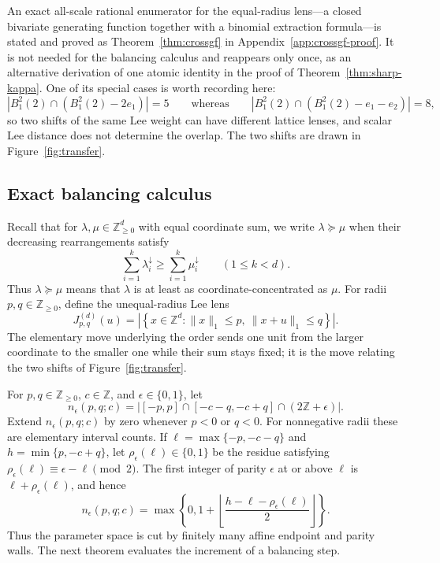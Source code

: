 \documentclass[pdflatex,sn-mathphys-num]{sn-jnl}
\theoremstyle{thmstyleone}
\theoremstyle{thmstylethree}
\theoremstyle{thmstyletwo}
\newcommand{\Z}{\mathbb Z}
\begin{document}
An exact all-scale rational enumerator for the equal-radius lens---a
closed bivariate generating function together with a binomial extraction
formula---is stated and proved as Theorem~\ref{thm:crossgf} in
Appendix~\ref{app:crossgf-proof}.  It is not needed for the balancing
calculus and reappears only once, as an alternative derivation of one
atomic identity in the proof of Theorem~\ref{thm:sharp-kappa}.  One of its
special cases is worth recording here:
\[
 |B_1^2(2)\cap(B_1^2(2)-2e_1)|=5
 \qquad\text{whereas}\qquad
 |B_1^2(2)\cap(B_1^2(2)-e_1-e_2)|=8,
\]
so two shifts of the same Lee weight can have different lattice lenses, and
scalar Lee distance does not determine the overlap.  The two shifts are
drawn in Figure~\ref{fig:transfer}.

\subsection{Exact balancing calculus}

Recall that for $\lambda,\mu\in\Z_{\ge0}^d$ with equal coordinate sum, we
write $\lambda\succeq\mu$ when their decreasing rearrangements satisfy
\[
 \sum_{i=1}^k \lambda_i^\downarrow\ge
 \sum_{i=1}^k \mu_i^\downarrow\qquad(1\le k<d).
\]
Thus $\lambda\succeq\mu$ means that $\lambda$ is at least as
coordinate-concentrated as $\mu$.  For radii $p,q\in\Z_{\ge0}$, define the unequal-radius Lee lens
\[
 J_{p,q}^{(d)}(u)=\left|\left\{x\in\Z^d:
 \|x\|_1\le p,\ \|x+u\|_1\le q\right\}\right|.
\]
The elementary move underlying the order sends one unit from the larger
coordinate to the smaller one while their sum stays fixed; it is the move
relating the two shifts of Figure~\ref{fig:transfer}.

For $p,q\in\Z_{\ge0}$, $c\in\Z$, and $\epsilon\in\{0,1\}$, let
\begin{equation}
 n_\epsilon(p,q;c)=
 \left|[-p,p]\cap[-c-q,-c+q]\cap(2\Z+\epsilon)\right|.  \label{eq:parity-count}
\end{equation}
Extend $n_\epsilon(p,q;c)$ by zero whenever $p<0$ or $q<0$.  For nonnegative
radii these are elementary interval counts.  If
$\ell=\max\{-p,-c-q\}$ and $h=\min\{p,-c+q\}$, let
$\rho_\epsilon(\ell)\in\{0,1\}$ be the residue satisfying
$\rho_\epsilon(\ell)\equiv\epsilon-\ell\pmod2$.  The first integer of parity
$\epsilon$ at or above $\ell$ is $\ell+\rho_\epsilon(\ell)$, and hence
\begin{equation}
 n_\epsilon(p,q;c)=
 \max\left\{0,1+\left\lfloor
 \frac{h-\ell-\rho_\epsilon(\ell)}2\right\rfloor\right\}. \label{eq:parity-floor}
\end{equation}
Thus the parameter space is cut by finitely many affine endpoint and parity
walls.  The next theorem evaluates the increment of a balancing step.
\end{document}
